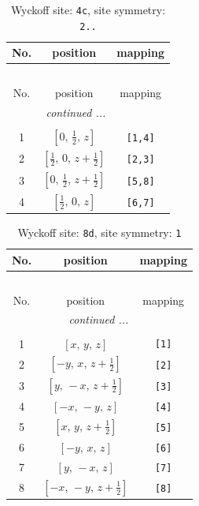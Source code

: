 \documentclass[fleqn,8pt]{jsarticle}
\begin{document}
\renewcommand{\arraystretch}{1.2}
\begin{longtable}{ccc}
\caption{Wyckoff site: {\tt 4c}, site symmetry: {\tt 2..}}
 \\
 \hline \hline
No. & position & mapping \\ \hline \endfirsthead

\multicolumn{2}{l}{\tablename\ \thetable{}} \\
 \hline \hline
No. & position & mapping \\ \hline \endhead

 \hline \hline
\multicolumn{2}{r}{\footnotesize\it continued ...} \\ \endfoot

 \hline \hline
\multicolumn{2}{r}{} \\ \endlastfoot

1 & $\left[ 0,\, \frac{1}{2},\, z \right]$ & {\tt [1,4]} \\ \hline
2 & $\left[ \frac{1}{2},\, 0,\, z + \frac{1}{2} \right]$ & {\tt [2,3]} \\ \hline
3 & $\left[ 0,\, \frac{1}{2},\, z + \frac{1}{2} \right]$ & {\tt [5,8]} \\ \hline
4 & $\left[ \frac{1}{2},\, 0,\, z \right]$ & {\tt [6,7]} \\
\end{longtable}
\renewcommand{\arraystretch}{1.2}
\begin{longtable}{ccc}
\caption{Wyckoff site: {\tt 8d}, site symmetry: {\tt 1}}
 \\
 \hline \hline
No. & position & mapping \\ \hline \endfirsthead

\multicolumn{2}{l}{\tablename\ \thetable{}} \\
 \hline \hline
No. & position & mapping \\ \hline \endhead

 \hline \hline
\multicolumn{2}{r}{\footnotesize\it continued ...} \\ \endfoot

 \hline \hline
\multicolumn{2}{r}{} \\ \endlastfoot

1 & $\left[ x,\, y,\, z \right]$ & {\tt [1]} \\ \hline
2 & $\left[ - y,\, x,\, z + \frac{1}{2} \right]$ & {\tt [2]} \\ \hline
3 & $\left[ y,\, - x,\, z + \frac{1}{2} \right]$ & {\tt [3]} \\ \hline
4 & $\left[ - x,\, - y,\, z \right]$ & {\tt [4]} \\ \hline
5 & $\left[ x,\, y,\, z + \frac{1}{2} \right]$ & {\tt [5]} \\ \hline
6 & $\left[ - y,\, x,\, z \right]$ & {\tt [6]} \\ \hline
7 & $\left[ y,\, - x,\, z \right]$ & {\tt [7]} \\ \hline
8 & $\left[ - x,\, - y,\, z + \frac{1}{2} \right]$ & {\tt [8]} \\
\end{longtable}
\end{document}
